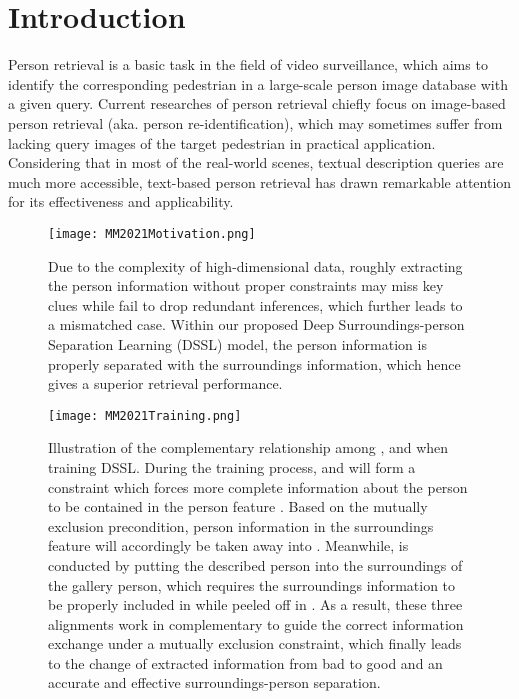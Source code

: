 \documentclass[sigconf]{acmart}
\begin{document}
\maketitle

\section{Introduction}

Person retrieval is a basic task in the field of video surveillance, which aims to identify the corresponding pedestrian in a large-scale person image database with a given query. Current researches of person retrieval chiefly focus on image-based person retrieval \cite{yi2014deepreid, IAM2019CVPR, SecondOrder2019} (aka. person re-identification), which may sometimes suffer from lacking query images of the target pedestrian in practical application. Considering that in most of the real-world scenes, textual description queries are much more accessible, text-based person retrieval \cite{Shuang2017Person, li2017identity, niu2020improving, Jing2018Pose, ARL, wang2020img, mm2019graphreid} has drawn remarkable attention for its effectiveness and applicability.

\begin{figure}[h]
	\centering
	\texttt{[image: MM2021Motivation.png]}
	\caption{Due to the complexity of high-dimensional data, roughly extracting the person information without proper constraints may miss key clues while fail to drop redundant inferences, which further leads to a mismatched case. Within our proposed Deep Surroundings-person Separation Learning (DSSL) model, the person information is properly separated with the surroundings information, which hence gives a superior retrieval performance.}
	\label{fig:motivation}
\end{figure}

\begin{figure*}[h]
	\centering
	\texttt{[image: MM2021Training.png]}
	\caption{Illustration of the complementary relationship among ,  and  when training DSSL. During the training process,  and  will form a constraint which forces more complete information about the person to be contained in the person feature . Based on the mutually exclusion precondition, person information in the surroundings feature  will accordingly be taken away into . Meanwhile,  is conducted by putting the described person into the surroundings of the gallery person, which requires the surroundings information to be properly included in  while peeled off in . As a result, these three alignments work in complementary to guide the correct information exchange under a mutually exclusion constraint, which finally leads to the change of extracted information from bad to good and an accurate and effective surroundings-person separation.}
	\label{fig:training}
\end{figure*}
\end{document}

